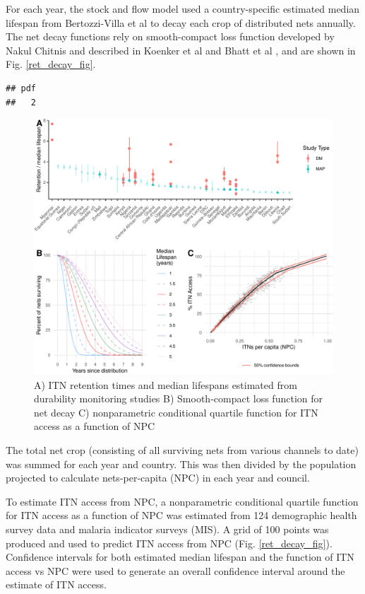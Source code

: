 \documentclass[review,
3p]{elsarticle} %
\begin{document}
For each year, the stock and flow model used a country-specific
estimated median lifespan from Bertozzi-Villa et al
\citep{10.1038/s41467-021-23707-7} to decay each crop of distributed
nets annually. The net decay functions rely on smooth-compact loss
function developed by Nakul Chitnis and described in Koenker et al and
Bhatt et al
\citep{Koenker:2013ed, Bhatt:2015gn, 10.1186/s12936-022-04272-w}, and
are shown in Fig. \ref{ret_decay_fig}.

\begin{verbatim}
## pdf 
##   2
\end{verbatim}

\begin{figure}
\includegraphics[width=0.8\linewidth]{quant_paper_files/figure-latex/ret_decay_fig-1} \caption{\label{ret_decay_fig}A) ITN retention times and median lifespans estimated from durability monitoring studies B) Smooth-compact loss function for net decay C) nonparametric conditional quartile function for ITN access as a function of NPC}\label{fig:ret_decay_fig}
\end{figure}

The total net crop (consisting of all surviving nets from various
channels to date) was summed for each year and country. This was then
divided by the population projected to calculate nets-per-capita (NPC)
in each year and council.

To estimate ITN access from NPC, a nonparametric conditional quartile
function for ITN access as a function of NPC was estimated from 124
demographic health survey data and malaria indicator surveys (MIS). A
grid of 100 points was produced and used to predict ITN access from NPC
(Fig. \ref{ret_decay_fig}). Confidence intervals for both estimated
median lifespan and the function of ITN access vs NPC were used to
generate an overall confidence interval around the estimate of ITN
access.
\end{document}
